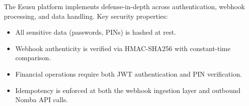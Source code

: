 \documentclass[11pt,a4paper]{article}
\begin{document}
The Esusu platform implements defense-in-depth across authentication,
webhook processing, and data handling. Key security properties:
\begin{itemize}[nosep]
  \item All sensitive data (passwords, PINs) is hashed at rest.
  \item Webhook authenticity is verified via HMAC-SHA256 with
        constant-time comparison.
  \item Financial operations require both JWT authentication and PIN
        verification.
  \item Idempotency is enforced at both the webhook ingestion layer and
        outbound Nomba API calls.
\end{itemize}
\end{document}
